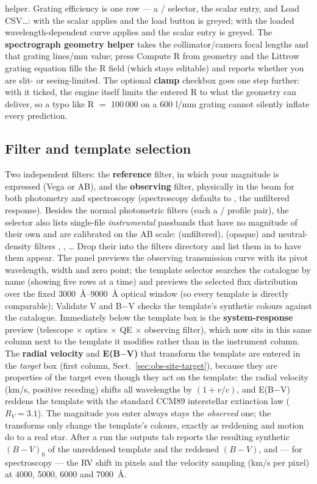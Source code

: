 helper. Grating efficiency is one row --- a /
selector, the scalar entry, and \textsf{Load CSV\ldots}: with 
the scalar applies and the load button is greyed; with  the
loaded wavelength-dependent curve applies and the scalar entry is greyed. The \textbf{spectrograph geometry helper} takes the
collimator/camera focal lengths and that grating lines/mm value; press
\textsf{Compute R from geometry} and the Littrow grating equation fills the
R field (which stays editable) and reports whether you are slit- or
seeing-limited. The optional \textbf{clamp} checkbox goes one step further:
with it ticked, the engine itself limits the entered R to what the geometry
can deliver, so a typo like R $=$ 100\,000 on a 600 l/mm grating cannot
silently inflate every prediction.

\subsection{Filter and template selection}

Two independent filters: the \textbf{reference} filter, in which your
magnitude is expressed (Vega or AB), and the \textbf{observing} filter,
physically in the beam for both photometry and spectroscopy (spectroscopy
defaults to , the unfiltered response). Besides the normal
photometric filters (each a / profile pair), the
selector also lists single-file \emph{instrumental} passbands that have no
magnitude of their own and are calibrated on the AB scale: 
(unfiltered),  (opaque) and neutral-density filters
, , … Drop their  into the filters
directory and list them in  to have them appear. The panel previews the
observing transmission curve with its pivot wavelength, width and zero
point; the template selector searches the catalogue by name (showing five
rows at a time) and previews
the selected flux distribution over the fixed \SIrange{3000}{9000}{\angstrom}
optical window (so every template is directly comparable); \textsf{Validate
V and B$-$V} checks the template's synthetic colours against the catalogue.
Immediately below the template box is the \textbf{system-response} preview
(telescope $\times$ optics $\times$ QE $\times$ observing filter), which
now sits in this same column next to the template it modifies rather than
in the instrument column.
The \textbf{radial velocity} and \textbf{E(B$-$V)} that transform the
template are entered in the \emph{target} box (first column,
Sect.~\ref{sec:obs-site-target}), because they are properties of the
target even though they act on
the template: the radial velocity (km/s, positive receding) shifts all
wavelengths by $(1+v/c)$, and E(B$-$V) reddens the template with the
standard CCM89 interstellar extinction law ($R_V = 3.1$). The magnitude
you enter always stays the \emph{observed} one; the transforms only
change the template's colours, exactly as reddening and motion do to a
real star. After a run the outputs tab reports the resulting synthetic
$(B-V)_0$ of the unreddened template and the reddened $(B-V)$, and — for
spectroscopy — the RV shift in pixels and the velocity sampling
(km/s per pixel) at 4000, 5000, 6000 and \SI{7000}{\angstrom}.

